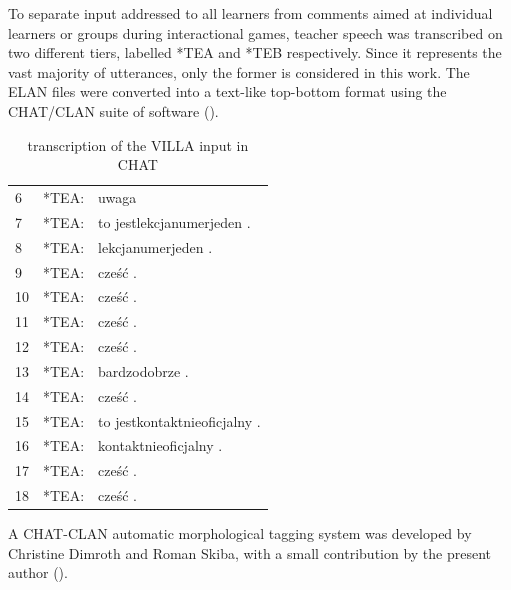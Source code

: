 To separate input addressed to all learners from comments aimed at individual learners or groups during interactional games, teacher speech was transcribed on two different tiers, labelled *TEA and *TEB respectively. Since it represents the vast majority of utterances, only the former is considered in this work. The ELAN files were converted into a text-like top-bottom format using the CHAT/CLAN \citep{MacWhinney2000} suite of software ().

\begin{table}
    \begin{tabular}{lrl}
        6    &   *TEA: & uwaga\\
        7    &   *TEA: & to jestlekcjanumerjeden . \\
        8    &   *TEA: & lekcjanumerjeden .  \\
        9    &   *TEA: & cześć .  \\
        10   &   *TEA: & cześć .  \\
        11   &   *TEA: & cześć .  \\
        12   &   *TEA: & cześć .  \\
        13   &   *TEA: & bardzodobrze .  \\
        14   &   *TEA: & cześć .  \\
        15   &   *TEA: & to jestkontaktnieoficjalny .  \\
        16   &   *TEA: & kontaktnieoficjalny .  \\
        17   &   *TEA: & cześć .  \\
        18   &   *TEA: & cześć . \\
    \end{tabular}
    \caption{transcription of the VILLA input in CHAT}
    \label{fig:02:4}
\end{table}

A CHAT-CLAN automatic morphological tagging system was developed by Christine Dimroth and Roman Skiba, with a small contribution by the present author (). 


